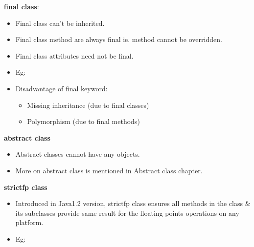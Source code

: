 \begin{flushleft}
	\textbf{final class}:
	\begin{itemize}
		\item Final class can’t be inherited. 
		\item Final class method are always final ie. method cannot be overridden.
		\item Final class attributes need not be final.
		\newpage
		\item Eg:
		\bigskip
		\item Disadvantage of final keyword:
		\begin{itemize}
			\item Missing inheritance (due to final classes)
			\item Polymorphism (due to final methods)
		\end{itemize}
		
	\end{itemize}	

	\textbf{abstract class}
	\begin{itemize}
		\item Abstract classes cannot have any objects.
		\item More on abstract class is mentioned in Abstract class chapter.
	\end{itemize}

	\textbf{strictfp class}
	\begin{itemize}
		\item Introduced in Java1.2 version, strictfp class ensures all methods in the class \& its subclasses provide same result for the floating points operations on any platform. 
		\item Eg:
		
	\end{itemize}
	
\end{flushleft}

\newpage
